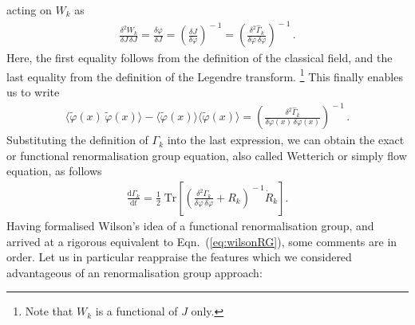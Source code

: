 \documentclass[11pt]{book}
\newcommand{\Tr}{\mathrm{Tr}}
\numberwithin{equation}{chapter}
\begin{document}
acting on $W_k$ as
\begin{align}
  \frac{ \delta^2 W_k }{ \delta J \, \delta J }
  = \frac{ \delta \varphi }{ \delta J }
  = \left( \frac{ \delta J }{ \delta \varphi } \right) ^{\!\! -1}
  = \left( \frac{ \delta^2 \hat \Gamma_k }{ \delta \varphi \, \delta \varphi } \right) ^{\!\! -1} \,.
\end{align}
Here, the first equality follows from the definition of the classical field,
and the last equality from the definition of the Legendre transform.%
\footnote{%
  Note that $W_k$ is a functional of $J$ only.
}
This finally enables us to write
\begin{align}
  \big\langle \tilde \varphi (x) \, \tilde \varphi (x) \big\rangle
  - \big\langle \tilde \varphi (x) \big\rangle \big\langle \tilde \varphi (x) \big\rangle
  = \left( \frac{ \delta^2 \hat \Gamma_k }{ \delta \varphi(x) \, \delta \varphi(x) } \right) ^{\!\! -1} \,.
\end{align}
Substituting the definition of $\Gamma_k$ into the last expression,
we can obtain the exact or functional renormalisation group equation,
also called Wetterich or simply flow equation, as follows
\begin{align}
    \frac{ \mathrm d \Gamma_k }{ \mathrm dt }
    = \frac 12 \; \Tr
    \left[
      \left(
        \frac{ \delta^2 \Gamma_k }{ \delta \varphi \, \delta \varphi } + R_k
      \right) ^{\!\!-1}
      \! \dot R_k
    \right] .
\end{align}
Having formalised Wilson's idea of a functional renormalisation group,
and arrived at a rigorous equivalent to Eqn.~(\ref{eq:wilsonRG}),
some comments are in order. Let us in particular reappraise the
features which we considered advantageous of an renormalisation group approach:
\bigskip
\end{document}
